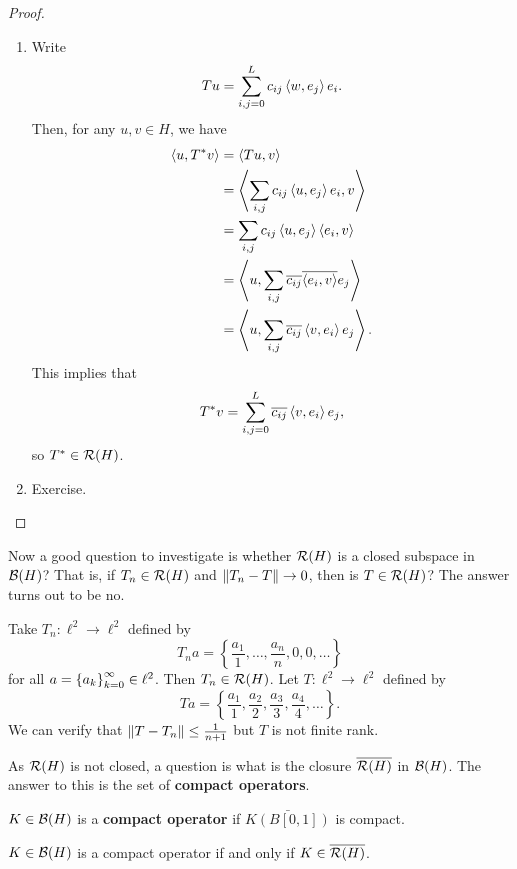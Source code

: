 \documentclass[a4paper]{article}
\begin{document}
\begin{proof}
\begin{enumerate}
  \item Write 
  \[
  T u = \sum_{i, j = 0}^L c_{ij} \left\langle w, e_j \right\rangle e_i.
  \]
  Then, for any $u, v \in H$, we have 
  \[
  \begin{aligned}
    \left\langle u, T^* v \right\rangle &= \left\langle T u, v \right\rangle  \\
    &= \left\langle \sum_{i, j} c_{ij} \left\langle u, e_j \right\rangle e_i, v \right\rangle \\
    &= \sum_{i, j} c_{ij} \left\langle u, e_j \right\rangle \left\langle e_i, v \right\rangle \\ 
    &= \left\langle u, \sum_{i, j} \overline{c_{ij}} \overline{\left\langle e_i, v \right\rangle} e_j \right\rangle \\
    &= \left\langle u, \sum_{i, j} \overline{c_{ij}} \left\langle v, e_i \right\rangle e_j \right\rangle.
  \end{aligned}
  \]
  This implies that 
  \[
  T^* v = \sum_{i, j = 0}^L \overline{c_{ij}} \left\langle v, e_i \right\rangle e_j,
  \]
  so $T^* \in \mathcal{R}(H)$.
  \item Exercise.
\end{enumerate}
\end{proof}

Now a good question to investigate is whether 
$\mathcal{R}(H)$ is a closed subspace in $\mathcal{B}(H)$?
That is, if $T_n \in \mathcal{R}(H)$ and $\left\lVert T_n - T\right\rVert \to 0$, 
then is $T \in \mathcal{R}(H)$? The answer turns out to be no. 

\begin{eg}
Take $T_n : \ell^2 \to \ell^2$ defined by 
\[
T_n a = \left\{ \frac{a_1}{1}, \dots, \frac{a_n}{n}, 0, 
0, \dots \right\}
\]
for all $a = \left\{ a_k \right\}_{k=0}^\infty \in \ell^2$. Then $T_n 
\in \mathcal{R}(H)$. Let $T : \ell^2 \to \ell^2$ defined 
by 
\[
T a = \left\{ \frac{a_1}{1}, \frac{a_2}{2}, 
\frac{a_3}{3}, \frac{a_4}{4}, \dots \right\}.
\]
We can verify that $\left\lVert T - T_n\right\rVert \leq \frac{1}{n + 1}$
but $T$ is not finite rank.
\end{eg}

As $\mathcal{R}(H)$ is not closed, a question is what is 
the closure $\overline{\mathcal{R}(H)}$ in $\mathcal{B}(H)$. The answer to 
this is the set of \textbf{compact operators}. 

\begin{defi}
  $K \in \mathcal{B}(H)$ is a \textbf{compact operator}
  if $\bar{K(B[0, 1])}$ is compact.
\end{defi}

\begin{thm}
$K \in \mathcal{B}(H)$ is a compact operator if and only if 
$K \in \overline{\mathcal{R}(H)}$.
\end{thm}
\end{document}
